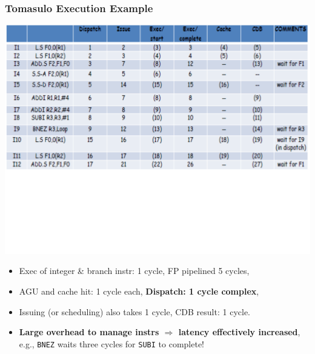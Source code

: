 \documentclass{beamer}
\newcommand{\emp}[1]{\textcolor{DikuRed}{ #1}}
\begin{document}
\begin{frame}[fragile,t]
\frametitle{Tomasulo Execution Example}

\includegraphics[width=64ex]{FigsOoOProc/TomasuloEg.pdf}
\vspace{-19ex}

\begin{itemize}
    \item Exec of integer \& branch instr: 1 cycle, FP pipelined 5 cycles, 
    \item AGU and cache hit: 1 cycle each, {\bf Dispatch: 1 cycle complex},
    \item Issuing (or scheduling) also takes 1 cycle, CDB result: 1 cycle.
    \item \emp{\bf Large overhead to manage instrs $\Rightarrow$ latency 
            effectively increased}\pause, e.g., {\tt BNEZ} waits three cycles
            for {\tt SUBI} to complete!

\end{itemize}
\end{frame}
\end{document}
